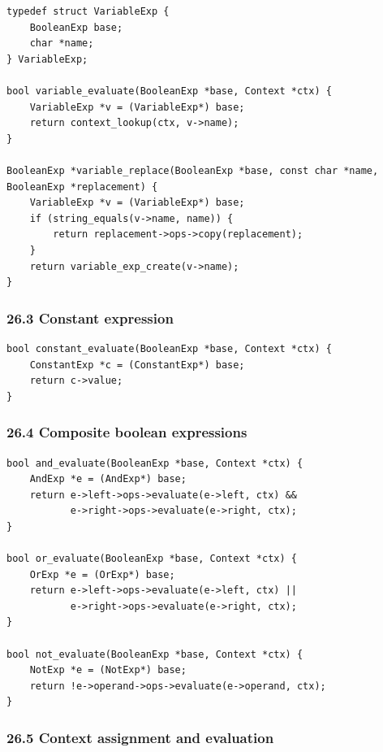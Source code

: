 \documentclass[11pt]{article}
\begin{document}
\begin{verbatim}
typedef struct VariableExp {
    BooleanExp base;
    char *name;
} VariableExp;

bool variable_evaluate(BooleanExp *base, Context *ctx) {
    VariableExp *v = (VariableExp*) base;
    return context_lookup(ctx, v->name);
}

BooleanExp *variable_replace(BooleanExp *base, const char *name, BooleanExp *replacement) {
    VariableExp *v = (VariableExp*) base;
    if (string_equals(v->name, name)) {
        return replacement->ops->copy(replacement);
    }
    return variable_exp_create(v->name);
}
\end{verbatim}

\subsubsection{26.3 Constant expression}\label{constant-expression}

\begin{verbatim}
bool constant_evaluate(BooleanExp *base, Context *ctx) {
    ConstantExp *c = (ConstantExp*) base;
    return c->value;
}
\end{verbatim}

\subsubsection{26.4 Composite boolean expressions}\label{composite-boolean-expressions}

\begin{verbatim}
bool and_evaluate(BooleanExp *base, Context *ctx) {
    AndExp *e = (AndExp*) base;
    return e->left->ops->evaluate(e->left, ctx) &&
           e->right->ops->evaluate(e->right, ctx);
}

bool or_evaluate(BooleanExp *base, Context *ctx) {
    OrExp *e = (OrExp*) base;
    return e->left->ops->evaluate(e->left, ctx) ||
           e->right->ops->evaluate(e->right, ctx);
}

bool not_evaluate(BooleanExp *base, Context *ctx) {
    NotExp *e = (NotExp*) base;
    return !e->operand->ops->evaluate(e->operand, ctx);
}
\end{verbatim}

\subsubsection{26.5 Context assignment and evaluation}\label{context-assignment-and-evaluation}
\end{document}
